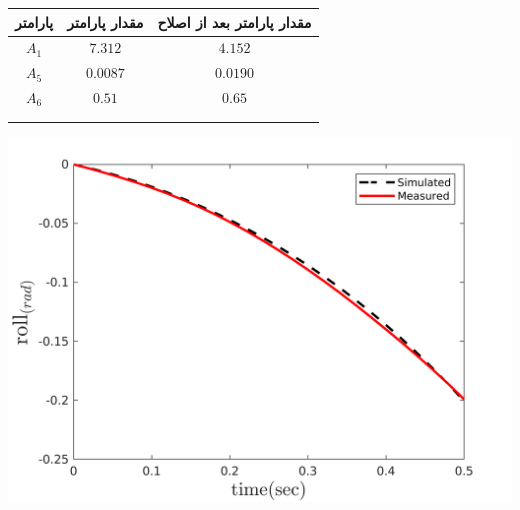   \begin{minipage}[H]{\linewidth}
	\hfill
	\begin{minipage}[b]{0.49\linewidth}
		\centering
		\begin{tabular}{ccc}\hline
			 پارامتر & مقدار پارامتر  & مقدار پارامتر بعد از اصلاح
			 \\ \hline
			$A_1$  & $7.312$ & $4.152$ \\
			$A_5$ & $0.0087$ & $0.0190$\\
			$A_6$ & $0.51$ & $0.65$\\\\\\
		\end{tabular}
	\end{minipage}
	\begin{minipage}[b]{0.48\linewidth}
		\centering
		\includegraphics[width=1\linewidth]{../Figures/RCP/roll_ml_parameter_estimation/RCP_roll_S2.png}
	\end{minipage}
\end{minipage}

\vspace{0.5cm}
